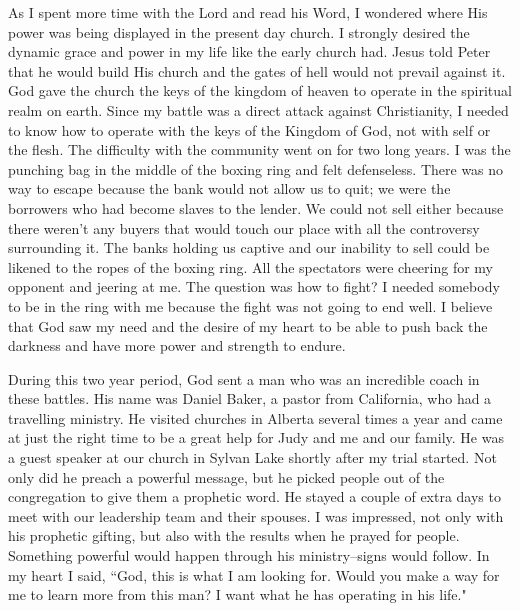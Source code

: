 \documentclass[oneside,12pt]{book}
\begin{document}
As I spent more time with the Lord and read his Word, I wondered where His power was being displayed in the present day church. I strongly desired the dynamic grace and power in my life like the early church had. Jesus told Peter that he would build His church and the gates of hell would not prevail against it. God gave the church the keys of the kingdom of heaven to operate in the spiritual realm on earth. Since my battle was a direct attack against Christianity, I needed to know how to operate with the keys of the Kingdom of God, not with self or the flesh. The difficulty with the community went on for two long years. I was the punching bag in the middle of the boxing ring and felt defenseless. There was no way to escape because the bank would not allow us to quit; we were the borrowers who had become slaves to the lender. We could not sell either because there weren't any buyers that would touch our place with all the controversy surrounding it. The banks holding us captive and our inability to sell could be likened to the ropes of the boxing ring. All the spectators were cheering for my opponent and jeering at me. The question was how to fight? I needed somebody to be in the ring with me because the fight was not going to end well. I believe that God saw my need and the desire of my heart to be able to push back the darkness and have more power and strength to endure.

During this two year period, God sent a man who was an incredible coach in these battles. His name was Daniel Baker, a pastor from California, who had a travelling ministry. He visited churches in Alberta several times a year and came at just the right time to be a great help for Judy and me and our family. He was a guest speaker at our church in Sylvan Lake shortly after my trial started. Not only did he preach a powerful message, but he picked people out of the congregation to give them a prophetic word. He stayed a couple of extra days to meet with our leadership team and their spouses. I was impressed, not only with his prophetic gifting, but also with the results when he prayed for people. Something powerful would happen through his ministry--signs would follow. In my heart I said, ``God, this is what I am looking for. Would you make a way for me to learn more from this man? I want what he has operating in his life."
\end{document}
